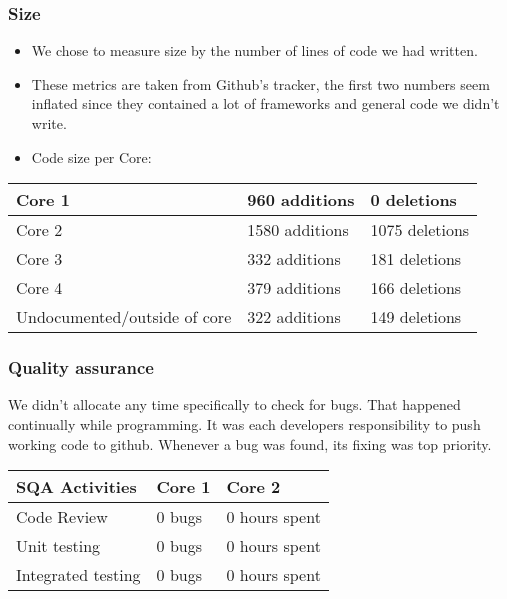 \subsubsection{Size}
\begin{itemize}
    \item We chose to measure size by the number of lines of code we had written.
    \item These metrics are taken from Github's tracker, the first two numbers seem inflated since they contained a lot of frameworks and general code we didn't write.
    \item Code size per Core: 
\end{itemize}
\begin{adjustbox}{center}
\begin{tabular}{l|l|l} %
        Core 1 & 960 additions & 0 deletions \\ \hline
        Core 2 & 1580 additions & 1075 deletions \\ \hline
        Core 3 & 332 additions & 181 deletions \\ \hline
        Core 4 & 379 additions & 166 deletions \\ \hline
        Undocumented/\break outside of core & 322 additions & 149 deletions \\
\end{tabular}
\end{adjustbox}

\subsubsection{Quality assurance}
We didn't allocate any time specifically to check for bugs. That happened continually while programming. It was each developers responsibility to push working code to github. Whenever a bug was found, its fixing was top priority.

\begin{adjustbox}{center}
\begin{tabular}{l|l|l} %
    SQA Activities & Core 1 & Core 2  \\ \hline
    Code Review
    & 0 bugs
    & 0 hours spent \\ \hline
    Unit testing
    & 0 bugs
    & 0 hours spent \\ \hline
    Integrated testing
    & 0 bugs
    & 0 hours spent
   
\end{tabular}
\end{adjustbox}

